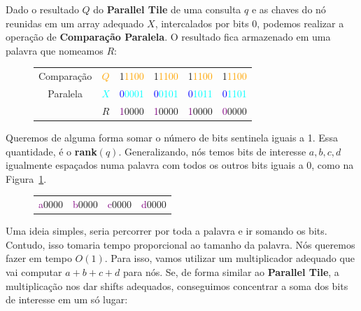 \hfill

Dado o resultado $Q$ do \textbf{Parallel Tile} de uma consulta $q$ e as chaves
do nó reunidas em um array adequado $X$, intercalados por bits 0, podemos
realizar a operação de \textbf{Comparação Paralela}. O resultado fica armazenado
em uma palavra que nomeamos $R$:

\begin{figure}[h]
\bf \Large \centering
\begin{tabular}{cccccc}
\large{Comparação} & \textcolor{Orange}{$Q$} &
\textcolor{RawSienna}{1}\textcolor{orange}{1100} &
\textcolor{RawSienna}{1}\textcolor{orange}{1100} &
\textcolor{RawSienna}{1}\textcolor{orange}{1100} &
\textcolor{RawSienna}{1}\textcolor{orange}{1100} \\
\large{Paralela} & \textcolor{cyan}{$X$} &
\textcolor{blue}{0}\textcolor{cyan}{0001} &
\textcolor{blue}{0}\textcolor{cyan}{0101} &
\textcolor{blue}{0}\textcolor{cyan}{1011} &
\textcolor{blue}{0}\textcolor{cyan}{1101} \\
\hline
& \textcolor{CarnationPink}{$R$} & 
\textcolor{Purple}{1}\textcolor{CarnationPink}{0000} &
\textcolor{Purple}{1}\textcolor{CarnationPink}{0000} &
\textcolor{Purple}{1}\textcolor{CarnationPink}{0000} &
\textcolor{Purple}{0}\textcolor{CarnationPink}{0000} 
\end{tabular}
\end{figure}

Queremos de alguma forma somar o número de bits sentinela iguais a 1. Essa
quantidade, é o \textbf{rank}$(q)$. Generalizando, nós temos bits de interesse
$a,b,c,d$ igualmente espaçados numa palavra com todos os outros bits iguais a 0,
como na Figura~\ref{f:bits-de-interesse}.

\begin{figure}[h]
\bf \Large \centering
\begin{tabular}{cccc}
\textcolor{Purple}{a}\textcolor{CarnationPink}{0000} &
\textcolor{Purple}{b}\textcolor{CarnationPink}{0000} &
\textcolor{Purple}{c}\textcolor{CarnationPink}{0000} &
\textcolor{Purple}{d}\textcolor{CarnationPink}{0000}
\end{tabular}
\label{f:bits-de-interesse}
\end{figure}

Uma ideia simples, seria percorrer por toda a palavra e ir somando os bits.
Contudo, isso tomaria tempo proporcional ao tamanho da palavra. Nós queremos
fazer em tempo $O(1)$. Para isso, vamos utilizar um multiplicador adequado que
vai computar $a+b+c+d$ para nós. Se, de forma similar ao \textbf{Parallel Tile},
a multiplicação nos dar shifts adequados, conseguimos concentrar a soma dos bits
de interesse em um só lugar:

